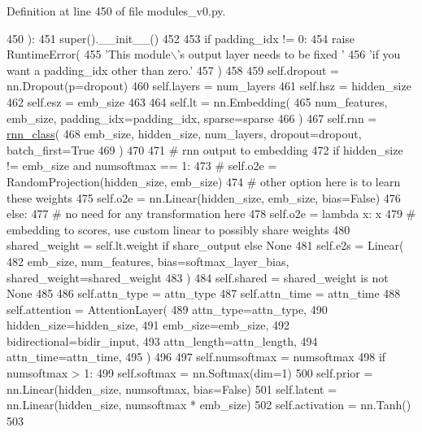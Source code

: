 Definition at line 450 of file modules\+\_\+v0.\+py.


\begin{DoxyCode}
450     ):
451         super().\_\_init\_\_()
452 
453         \textcolor{keywordflow}{if} padding\_idx != 0:
454             \textcolor{keywordflow}{raise} RuntimeError(
455                 \textcolor{stringliteral}{'This module\(\backslash\)'s output layer needs to be fixed '}
456                 \textcolor{stringliteral}{'if you want a padding\_idx other than zero.'}
457             )
458 
459         self.dropout = nn.Dropout(p=dropout)
460         self.layers = num\_layers
461         self.hsz = hidden\_size
462         self.esz = emb\_size
463 
464         self.lt = nn.Embedding(
465             num\_features, emb\_size, padding\_idx=padding\_idx, sparse=sparse
466         )
467         self.rnn = \hyperlink{namespaceseq2seq_1_1train_a46177da1cc74c4a2874e4a527d857f75}{rnn\_class}(
468             emb\_size, hidden\_size, num\_layers, dropout=dropout, batch\_first=\textcolor{keyword}{True}
469         )
470 
471         \textcolor{comment}{# rnn output to embedding}
472         \textcolor{keywordflow}{if} hidden\_size != emb\_size \textcolor{keywordflow}{and} numsoftmax == 1:
473             \textcolor{comment}{# self.o2e = RandomProjection(hidden\_size, emb\_size)}
474             \textcolor{comment}{# other option here is to learn these weights}
475             self.o2e = nn.Linear(hidden\_size, emb\_size, bias=\textcolor{keyword}{False})
476         \textcolor{keywordflow}{else}:
477             \textcolor{comment}{# no need for any transformation here}
478             self.o2e = \textcolor{keyword}{lambda} x: x
479         \textcolor{comment}{# embedding to scores, use custom linear to possibly share weights}
480         shared\_weight = self.lt.weight \textcolor{keywordflow}{if} share\_output \textcolor{keywordflow}{else} \textcolor{keywordtype}{None}
481         self.e2s = Linear(
482             emb\_size, num\_features, bias=softmax\_layer\_bias, shared\_weight=shared\_weight
483         )
484         self.shared = shared\_weight \textcolor{keywordflow}{is} \textcolor{keywordflow}{not} \textcolor{keywordtype}{None}
485 
486         self.attn\_type = attn\_type
487         self.attn\_time = attn\_time
488         self.attention = AttentionLayer(
489             attn\_type=attn\_type,
490             hidden\_size=hidden\_size,
491             emb\_size=emb\_size,
492             bidirectional=bidir\_input,
493             attn\_length=attn\_length,
494             attn\_time=attn\_time,
495         )
496 
497         self.numsoftmax = numsoftmax
498         \textcolor{keywordflow}{if} numsoftmax > 1:
499             self.softmax = nn.Softmax(dim=1)
500             self.prior = nn.Linear(hidden\_size, numsoftmax, bias=\textcolor{keyword}{False})
501             self.latent = nn.Linear(hidden\_size, numsoftmax * emb\_size)
502             self.activation = nn.Tanh()
503 
\end{DoxyCode}



